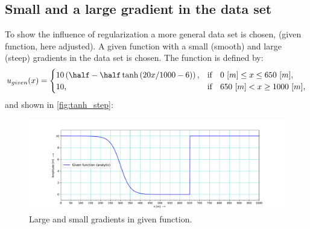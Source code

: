 \subsection{Small and a large gradient in the data set}
To show the influence of  regularization a more general data set is chosen, \citet{Borsboom1998} (given function, here adjusted).
A given function  with a small (smooth) and large  (steep) gradients in the data set is chosen.
The function is defined by:
\begin{align}
u_{given}(x) =
\begin{cases}
    10 \left(\half - \half \tanh{(20x/1000-6)}\right), & \text{if} \quad 0\ [m] \leq x \leq 650\ [m],
    \\
    10, & \text{if} \quad 650\ [m] < x \geq 1000 \ [m],
\end{cases}
\end{align}
and shown in \autoref{fig:tanh_step}:
\begin{figure}[H]
    \centering
    \includegraphics[width=1.0\textwidth]{figures/regul_tanh_step.pdf}
    \caption{Large and small gradients in given function. \label{fig:tanh_step}}
\end{figure}

